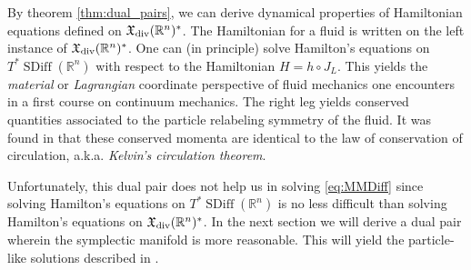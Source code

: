 \documentclass[12pt]{amsart}
\newcommand{\R}{\ensuremath{\mathbb{R}}}
\DeclareMathOperator{\SDiff}{SDiff}
\begin{document}
By theorem \ref{thm:dual_pairs}, we can derive dynamical properties of Hamiltonian equations defined on $\mathfrak{X}_{\rm div}(\R^n)^*$.
The Hamiltonian for a fluid is written on the left instance of $\mathfrak{X}_{\rm div}(\R^n)^*$.
One can (in principle) solve Hamilton's equations on $T^*\SDiff(\R^n)$
with respect to the Hamiltonian $H = h \circ J_L$.
This yields the \emph{material} or \emph{Lagrangian} coordinate perspective
of fluid mechanics one encounters in a first course on continuum
mechanics.
The right leg yields conserved quantities associated to the particle relabeling symmetry of the fluid.
It was found in \cite{Arnold1966} that these conserved momenta are identical
to the law of conservation of circulation, a.k.a. \emph{Kelvin's circulation theorem}.

Unfortunately, this dual pair does not help us in solving \eqref{eq:MMDiff}
since solving Hamilton's equations on $T^*\SDiff(\R^n)$ is no less difficult
than solving Hamilton's equations on $\mathfrak{X}_{\rm div}(\R^n)^*$.
In the next section we will derive a dual pair wherein the symplectic
manifold is more reasonable.
This will yield the particle-like solutions described in \cite{MumfordMichor2013}.
\end{document}
